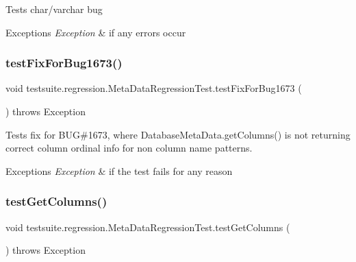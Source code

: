 Tests char/varchar bug


\begin{DoxyExceptions}{Exceptions}
{\em Exception} & if any errors occur \\
\hline
\end{DoxyExceptions}
\mbox{\label{classtestsuite_1_1regression_1_1_meta_data_regression_test_ab44999b95186ac7d583472c97d1fe24c}} 
\subsubsection{\texorpdfstring{test\+Fix\+For\+Bug1673()}{testFixForBug1673()}}
{\footnotesize\ttfamily void testsuite.\+regression.\+Meta\+Data\+Regression\+Test.\+test\+Fix\+For\+Bug1673 (\begin{DoxyParamCaption}{ }\end{DoxyParamCaption}) throws Exception}

Tests fix for B\+UG\#1673, where Database\+Meta\+Data.\+get\+Columns() is not returning correct column ordinal info for non \textquotesingle{}\textquotesingle{} column name patterns.


\begin{DoxyExceptions}{Exceptions}
{\em Exception} & if the test fails for any reason \\
\hline
\end{DoxyExceptions}
\mbox{\label{classtestsuite_1_1regression_1_1_meta_data_regression_test_a858c6ccbb86008517405f2e20ff56399}} 
\subsubsection{\texorpdfstring{test\+Get\+Columns()}{testGetColumns()}}
{\footnotesize\ttfamily void testsuite.\+regression.\+Meta\+Data\+Regression\+Test.\+test\+Get\+Columns (\begin{DoxyParamCaption}{ }\end{DoxyParamCaption}) throws Exception}


